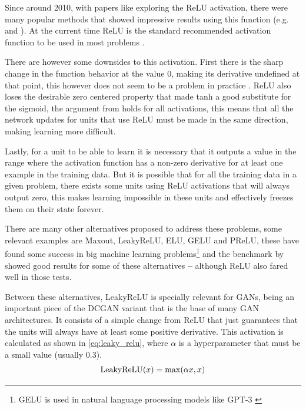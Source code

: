 Since around 2010, with papers like \cite{relu2011} exploring the \gls{ReLU} activation, there were many popular methods that showed impressive results using this function (e.g. \cite{alexnet2012} and \cite{inceptionV3_2015}). At the current time \gls{ReLU} is the standard recommended activation function to be used in most problems \cite{deepLearningBook2016}.

There are however some downsides to this activation. First there is the sharp change in the function behavior at the value $0$, making its derivative undefined at that point, this however does not seem to be a problem in practice \cite{relu2011}. \gls{ReLU} also loses the desirable zero centered property that made \gls{tanh} a good substitute for the sigmoid, the argument from \textcite{efficientBackprop2012} holds for all activations, this means that all the network updates for units that use \gls{ReLU} must be made in the same direction, making learning more difficult.

Lastly, for a unit to be able to learn it is necessary that it outputs a value in the range where the activation function has a non-zero derivative for at least one example in the training data. But it is possible that for all the training data in a given problem, there exists some units using \gls{ReLU} activations that will always output zero, this makes learning impossible in these units and effectively freezes them on their state forever.

There are many other alternatives proposed to address these problems, some relevant examples are Maxout, LeakyReLU, ELU, GELU and PReLU, these have found some success in big machine learning problems\footnote{
    GELU is used in natural language processing models like GPT-3 \cite{gpt3_2020}
} and the benchmark by \cite{CaffeNetBench2017} showed good results for some of these alternatives \textbf{--} although \gls{ReLU} also fared well in those tests.

Between these alternatives, LeakyReLU is specially relevant for \acp{GAN}, being an important piece of the \gls{DCGAN} variant that is the base of many \gls{GAN} architectures. It consists of a simple change from ReLU that just guarantees that the units will always have at least some positive derivative. This activation is calculated as shown in \autoref{eq:leaky_relu}, where $\alpha$ is a hyperparameter that must be a small value (usually $0.3$).
\begin{equation} \label{eq:leaky_relu}
    \operatorname{LeakyReLU}(x) = \max(\alpha x, x)
\end{equation}

